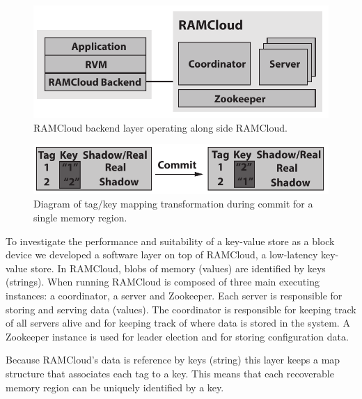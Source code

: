 
\begin{figure}[t!]
\begin{center}
\includegraphics[scale=0.60]{graphs/ramcloud_backend_design2.pdf}
\end{center}
\caption{RAMCloud backend layer operating along side RAMCloud.}
\label{fig:ramcloud_backend_design}
\end{figure}

\begin{figure}[t!]
\begin{center}
\includegraphics[scale=0.60]{graphs/ramcloud_backend_commit.pdf}
\end{center}
\caption{Diagram of tag/key mapping transformation during commit for a single memory region.}
\label{fig:ramcloud_backend_commit}
\end{figure}

To investigate the performance and suitability of a key-value store as a block device we developed a software layer on top of RAMCloud, a low-latency key-value store.
In RAMCloud, blobs of memory (values) are identified by keys (strings). When running RAMCloud is composed of three main executing instances: a coordinator, a server and Zookeeper.
Each server is responsible for storing and serving data (values). The coordinator is responsible for keeping track of all servers alive and for keeping track of where data is stored in the system.
A Zookeeper instance is used for leader election and for storing configuration data.

Because RAMCloud's data is reference by keys (string) this layer keeps a map structure that associates each tag to a key. This means that each recoverable memory region can be uniquely identified by a key.

